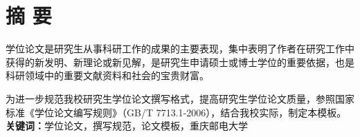 

	


\chapter{摘 \quad 要}

学位论文是研究生从事科研工作的成果的主要表现，集中表明了作者在研究工作中获得的新发明、新理论或新见解，是研究生申请硕士或博士学位的重要依据，也是科研领域中的重要文献资料和社会的宝贵财富。

为进一步规范我校研究生学位论文撰写格式，提高研究生学位论文质量，参照国家标准《学位论文编写规则》（GB/T 7713.1-2006），结合我校实际，制定本模板。
\\
  
\noindent\songti\textbf{关键词：}学位论文，撰写规范，论文模板，重庆邮电大学

\clearpage